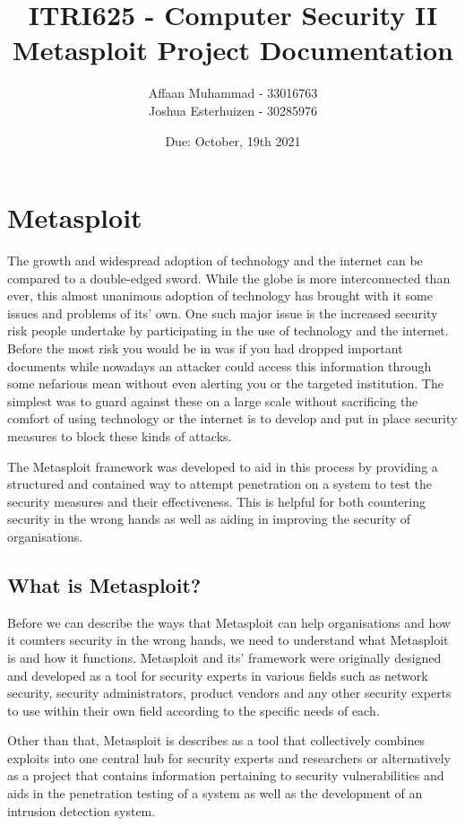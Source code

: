 \documentclass[a4paper, 12pt, titlepage]{report}
\begin{document}
\linespread{1.5}
\author{Affaan Muhammad - 33016763\\Joshua Esterhuizen - 30285976}
\title{ITRI625 - Computer Security II\\Metasploit Project Documentation}
\date{Due: October, 19th 2021}
\maketitle
\tableofcontents{}
\chapter{Metasploit}
The growth and widespread adoption of technology and the internet can be compared to a double-edged sword. While the globe is more interconnected than ever, this almost unanimous adoption of technology has brought with it some issues and problems of its’ own. One such major issue is the increased security risk people undertake by participating in the use of technology and the internet. Before the most risk you would be in was if you had dropped important documents while nowadays an attacker could access this information through some nefarious mean without even alerting you or the targeted institution. The simplest was to guard against these on a large scale without sacrificing the comfort of using technology or the internet is to develop and put in place security measures to block these kinds of attacks. 

The Metasploit framework was developed to aid in this process by providing a structured and contained way to attempt penetration on a system to test the security measures and their effectiveness.  This is helpful for both countering security in the wrong hands as well as aiding in improving the security of organisations.
\section{What is Metasploit?}
Before we can describe the ways that Metasploit can help organisations and how it counters security in the wrong hands, we need to understand what Metasploit is and how it functions. Metasploit and its’ framework were originally designed and developed as a tool for security experts in various fields such as network security, security administrators, product vendors and any other security experts to use within their own field according to the specific needs of each.\cite{testIDS}

Other than that, Metasploit is describes as a tool that collectively combines exploits into one central hub for security experts and researchers or alternatively as a project that contains information pertaining to security vulnerabilities and aids in the penetration testing of a system as well as the development of an intrusion detection system.\cite{goodDef, testIDS}
\end{document}
